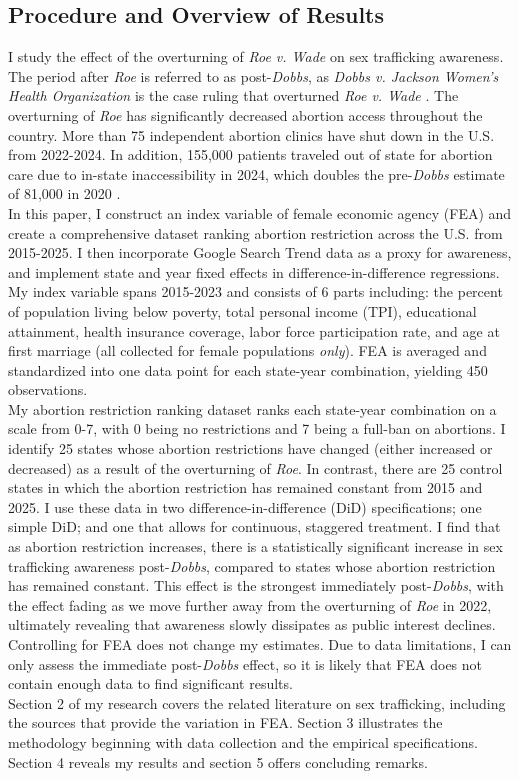 \documentclass[10pt]{article}
\begin{document}
\subsection{Procedure and Overview of Results}
\indent I study the effect of the overturning of \textit{Roe v. Wade} on sex trafficking awareness. The period after \textit{Roe} is referred to as post-\textit{Dobbs}, as \textit{Dobbs v. Jackson Women’s Health Organization} \citep{dobbs2022} is the case ruling that overturned \textit{Roe v. Wade} \citep{roe_v_wade}. The overturning of \textit{Roe} has significantly decreased abortion access throughout the country. More than 75 independent abortion clinics have shut down in the U.S. from 2022-2024. In addition, 155,000 patients traveled out of state for abortion care due to in-state inaccessibility in 2024, which doubles the pre-\textit{Dobbs} estimate of 81,000 in 2020 \citep{kff2026abortion}. \\
\indent In this paper, I construct an index variable of female economic agency (FEA) and create a comprehensive dataset ranking abortion restriction across the U.S. from 2015-2025. I then incorporate Google Search Trend data as a proxy for awareness, and implement state and year fixed effects in difference-in-difference regressions. My index variable spans 2015-2023 and consists of 6 parts including: the percent of population living below poverty, total personal income (TPI), educational attainment, health insurance coverage, labor force participation rate, and age at first marriage (all collected for female populations \textit{only}). FEA is averaged and standardized into one data point for each state-year combination, yielding 450 observations. \\
\indent My abortion restriction ranking dataset ranks each state-year combination on a scale from 0-7, with 0 being no restrictions and 7 being a full-ban on abortions. I identify 25 states whose abortion restrictions have changed (either increased or decreased) as a result of the overturning of \textit{Roe}. In contrast, there are 25 control states in which the abortion restriction has remained constant from 2015 and 2025. I use these data in two difference-in-difference (DiD) specifications; one simple DiD; and one that allows for continuous, staggered treatment. I find that as abortion restriction increases, there is a statistically significant increase in sex trafficking awareness post-\textit{Dobbs}, compared to states whose abortion restriction has remained constant. This effect is the strongest immediately post-\textit{Dobbs}, with the effect fading as we move further away from the overturning of \textit{Roe} in 2022, ultimately revealing that awareness slowly dissipates as public interest declines. Controlling for FEA does not change my estimates. Due to data limitations, I can only assess the immediate post-\textit{Dobbs} effect, so it is likely that FEA does not contain enough data to find significant results. \\
\indent Section 2 of my research covers the related literature on sex trafficking, including the sources that provide the variation in FEA. Section 3 illustrates the methodology beginning with data collection and the empirical specifications. Section 4 reveals my results and section 5 offers concluding remarks. 
\end{document}
